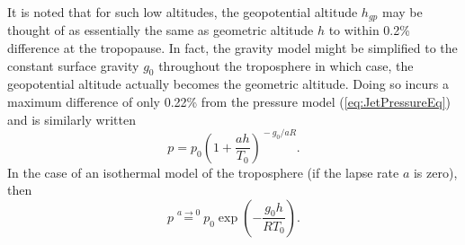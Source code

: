 \documentclass[11pt,dvipsnames]{thesis}
\begin{document}
It is noted that for such low altitudes, the geopotential altitude $h_{gp}$ may be thought of as essentially the same as geometric altitude $h$ to within 0.2\% difference at the tropopause.
In fact, the gravity model might be simplified to the constant surface gravity $g_0$ throughout the troposphere in which case, the geopotential altitude actually becomes the geometric altitude. Doing so incurs a maximum difference of only 0.22\% from the pressure model (\ref{eq:JetPressureEq}) and is similarly written
\begin{equation}
p = p_0 \left(1 + \frac{a h}{T_0}\right)^{\!-g_0 / a R}.
\end{equation}
In the case of an isothermal model of the troposphere (if the lapse rate $a$ is zero), then
\begin{equation}
p \overset{a \to 0}{=} p_0 \exp\!\left(-\frac{g_0 h}{R T_0}\right).
\end{equation}
\end{document}

